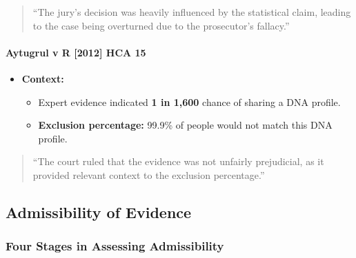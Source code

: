 \begin{quote}
``The jury's decision was heavily influenced by the statistical claim,
leading to the case being overturned due to the prosecutor's fallacy.''
\end{quote}

\paragraph{Aytugrul v R {[}2012{]} HCA
15}\label{aytugrul-v-r-2012-hca-15}

\begin{itemize}
\tightlist
\item
  \textbf{Context:}

  \begin{itemize}
  \tightlist
  \item
    Expert evidence indicated \textbf{1 in 1,600} chance of sharing a
    DNA profile.
  \item
    \textbf{Exclusion percentage:} 99.9\% of people would not match this
    DNA profile.
  \end{itemize}
\end{itemize}

\begin{quote}
``The court ruled that the evidence was not unfairly prejudicial, as it
provided relevant context to the exclusion percentage.''
\end{quote}

\subsection{  Admissibility of
Evidence}\label{admissibility-of-evidence-1}

\subsubsection{Four Stages in Assessing
Admissibility}\label{four-stages-in-assessing-admissibility}

